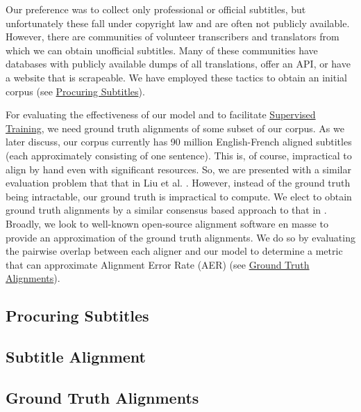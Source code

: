 \documentclass[twoside,twocolumn]{article}
\begin{document}
Our preference was to collect only professional or official subtitles, but
unfortunately these fall under copyright law and are often not publicly
available. However, there are communities of volunteer transcribers and
translators from which we can obtain unofficial subtitles. Many of these
communities have databases with publicly available dumps of all translations,
offer an API, or have a website that is scrapeable. We have employed these
tactics to obtain an initial corpus (see
\hyperref[subsec:procuring-subtitles]{Procuring Subtitles}).

For evaluating the effectiveness of our model and to facilitate
\hyperref[sec:supervised-training]{Supervised Training}, we need ground truth
alignments of some subset of our corpus. As we later discuss, our corpus
currently has 90 million English-French aligned subtitles (each approximately
consisting of one sentence). This is, of course, impractical to align by hand
even with significant resources. So, we are presented with a similar evaluation
problem that that in Liu et al. \cite{liu2015streaming}. However, instead of
the ground truth being intractable, our ground truth is impractical to compute.
We elect to obtain ground truth alignments by a similar consensus based
approach to that in \cite{liu2015streaming}. Broadly, we look to well-known
open-source alignment software en masse to provide an approximation of the
ground truth alignments. We do so by evaluating the pairwise overlap between
each aligner and our model to determine a metric that can approximate
Alignment Error Rate (AER) (see
\hyperref[subsec:ground-truth-alignments]{Ground Truth Alignments}).


\subsection{Procuring Subtitles}
\label{subsec:procuring-subtitles}



\subsection{Subtitle Alignment}
\label{subsec:subtitle-alignment}



\subsection{Ground Truth Alignments}
\label{subsec:ground-truth-alignments}
\end{document}

